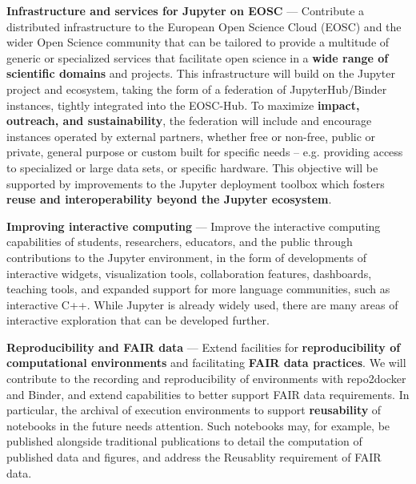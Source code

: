 \begin{compactenum}

\item \label{obj:deployment}
  \textbf{Infrastructure and services for Jupyter on EOSC} ---
  Contribute a distributed infrastructure to the European Open Science Cloud
  (EOSC) and the wider Open Science community that can be tailored to
  provide a multitude of generic or specialized services that facilitate
  open science in a \textbf{wide range of scientific domains} and projects.
  This infrastructure will build on the Jupyter project and ecosystem,
  taking the form of a federation of JupyterHub/Binder instances,
  tightly integrated into the EOSC-Hub.
  To maximize \textbf{impact, outreach, and sustainability},
  the federation will include and encourage instances operated by
  external partners, whether free or non-free, public or private,
  general purpose or custom built for specific needs -- e.g.
  providing access to specialized or large data sets, or specific hardware.
  This objective will be supported by improvements to the Jupyter
  deployment toolbox which fosters \textbf{reuse and interoperability
    beyond the Jupyter ecosystem}.

\item \label{obj:interactivity}
  \textbf{Improving interactive computing} ---
  Improve the interactive computing capabilities of
  students, researchers, educators, and the public
  through contributions to the Jupyter environment,
  in the form of developments of interactive widgets,
  visualization tools, collaboration features, dashboards,
  teaching tools,
  and expanded support for more language communities,
  such as interactive C++.
  While Jupyter is already widely used,
  there are many areas
  of interactive exploration that can be developed further.

\item \label{obj:reusability}
  \textbf{Reproducibility and FAIR data} ---
  Extend facilities for
  \textbf{reproducibility of computational environments}
  and facilitating \textbf{FAIR data practices}.
  We will contribute to the recording and reproducibility
  of environments with repo2docker and Binder,
  and extend capabilities to better support FAIR
  data requirements. In particular, the archival of execution
  environments to support \textbf{reusability} of notebooks in the future
  needs attention. Such notebooks may, for example, be published alongside
  traditional publications to detail the computation of published data
  and figures, and address the Reusablity requirement of FAIR data.


\end{compactenum}
